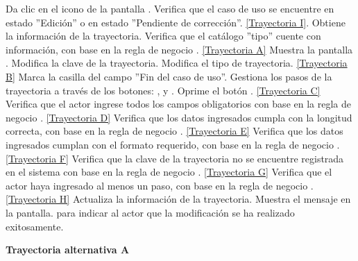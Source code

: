 	\begin{UCtrayectoria}
		\UCpaso[\UCactor] Da clic en el icono \editar de la pantalla .
		\UCpaso[\UCsist] Verifica que el caso de uso se encuentre en estado ''Edición'' o en estado ''Pendiente de corrección''. \hyperlink{CU12-1-1-2:TAI}{[Trayectoria I]}.
		\UCpaso[\UCsist] Obtiene la información de la trayectoria.
		\UCpaso[\UCsist] Verifica que el catálogo ''tipo'' cuente con información, con base en la regla de negocio . \hyperlink{CU12-1-1-2:TAA}{[Trayectoria A]}
		\UCpaso[\UCsist] Muestra la pantalla .\label{CU12.1.1.2-P14}
		\UCpaso[\UCactor] Modifica la clave de la trayectoria. \label{CU12.1.1.2-P15}
		\UCpaso[\UCactor] Modifica el tipo de trayectoria. \hyperlink{CU12-1-1-2:TAB}{[Trayectoria B]} \label{CU12.1.1.2-P16}
		\UCpaso[\UCsist] Marca la casilla del campo ''Fin del caso de uso''.
		\UCpaso[\UCactor] Gestiona los pasos de la trayectoria a través de los botones: , \editar y \eliminar. \label{CU12.1.1.2-P18}
		\UCpaso[\UCactor] Oprime el botón . \hyperlink{CU12-1-1-2:TAC}{[Trayectoria C]} 
		\UCpaso[\UCsist] Verifica que el actor ingrese todos los campos obligatorios con base en la regla de negocio . \hyperlink{CU12-1-1-2:TAD}{[Trayectoria D]}
		\UCpaso[\UCsist] Verifica que los datos ingresados cumpla con la longitud correcta, con base en la regla de negocio . \hyperlink{CU12-1-1-2:TAE}{[Trayectoria E]}
		\UCpaso[\UCsist] Verifica que los datos ingresados cumplan con el formato requerido, con base en la regla de negocio . \hyperlink{CU12-1-1-2:TAF}{[Trayectoria F]}
		\UCpaso[\UCsist] Verifica que la clave de la trayectoria no se encuentre registrada en el sistema con base en la regla de negocio . \hyperlink{CU12-1-1-2:TAG}{[Trayectoria G]}
		\UCpaso[\UCsist] Verifica que el actor haya ingresado al menos un paso, con base en la regla de negocio . \hyperlink{CU12-1-1-2:TAH}{[Trayectoria H]}
		\UCpaso[\UCsist] Actualiza la información de la trayectoria.
		\UCpaso[\UCsist] Muestra el mensaje  en la pantalla.  para indicar al actor que la modificación se ha realizado exitosamente.
	\end{UCtrayectoria}		
\hypertarget{CU12-1-1-2:TAA}{\textbf{Trayectoria alternativa A}}\\
